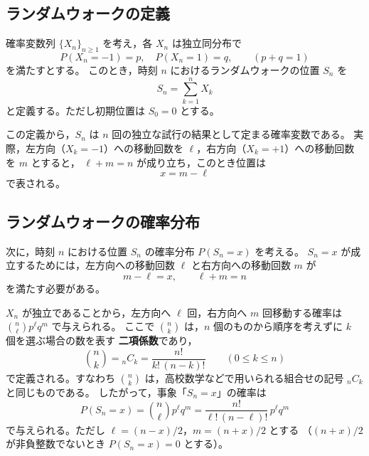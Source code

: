 \documentclass[a4j,dvipdfmx]{jsarticle}
\theoremstyle{plainnote}
\begin{document}
\subsection{ランダムウォークの定義}

確率変数列 $\{X_n\}_{n \geq 1}$ を考え，各 $X_n$ は独立同分布で
\begin{equation}
  P(X_n = -1) = p, \quad P(X_n = 1) = q, \qquad (p + q = 1) \label{eq:rv}
\end{equation}
を満たすとする。
このとき，時刻 $n$ におけるランダムウォークの位置 $S_n$ を
\begin{equation}
  S_n = \sum_{k=1}^{n} X_k \label{eq:Sn}
\end{equation}
と定義する。ただし初期位置は $S_0 = 0$ とする。

この定義から，$S_n$ は $n$ 回の独立な試行の結果として定まる確率変数である。
実際，左方向（$X_k = -1$）への移動回数を $\ell$，右方向（$X_k = +1$）への移動回数を $m$ とすると，
$\ell + m = n$ が成り立ち，このとき位置は
\begin{equation}
  x = m - \ell \label{eq:pos}
\end{equation}
で表される。

\subsection{ランダムウォークの確率分布}

次に，時刻 $n$ における位置 $S_n$ の確率分布 $P(S_n = x)$ を考える。
$S_n = x$ が成立するためには，左方向への移動回数 $\ell$ と右方向への移動回数 $m$ が
\begin{equation}
  m - \ell = x, \qquad \ell + m = n \label{eq:lm}
\end{equation}
を満たす必要がある。

$X_n$ が独立であることから，左方向へ $\ell$ 回，右方向へ $m$ 回移動する確率は
$\binom{n}{\ell} p^\ell q^m$ で与えられる。
ここで $\binom{n}{k}$ は，$n$ 個のものから順序を考えずに $k$ 個を選ぶ場合の数を表す
\textbf{二項係数}であり，
\begin{equation}
  \binom{n}{k} = {}_n C_k = \frac{n!}{k!\,(n-k)!}
  \qquad (0\leq k\leq n)
  \label{eq:binom}
\end{equation}
で定義される。すなわち $\binom{n}{k}$ は，高校数学などで用いられる組合せの記号 ${}_n C_k$ と同じものである。
したがって，事象「$S_n = x$」の確率は
\begin{equation}
  P(S_n = x) = \binom{n}{\ell} p^\ell q^m
  = \frac{n!}{\ell!\,(n-\ell)!}\,p^\ell q^m
  \label{eq:dist}
\end{equation}
で与えられる。ただし $\ell = (n-x)/2$，$m = (n+x)/2$ とする
（$(n+x)/2$ が非負整数でないとき $P(S_n=x)=0$ とする）。
\end{document}
